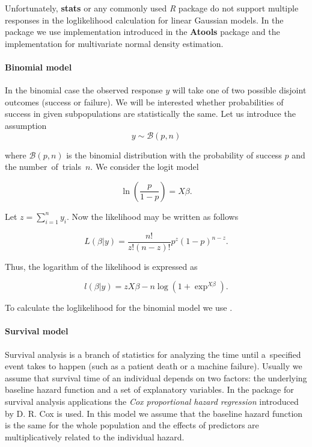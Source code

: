Unfortunately, \textbf{stats} or any commonly used \emph{R} package do not support multiple responses in the loglikelihood calculation for linear Gaussian models. In the package we use  implementation introduced in the \textbf{Atools} package \citep{atools} and the  \citep{mvtnorm} implementation for multivariate normal density estimation.

\break

\paragraph{Binomial model}

In the binomial case the observed response $y$ will take one of two possible disjoint outcomes (success or failure). We will be interested whether probabilities of success in given subpopulations are statistically the same. Let us introduce the assumption
$$y \sim \mathcal{B}\left(p, n\right)$$

where $\mathcal{B}\left(p,n\right)$ is the binomial distribution with the probability of success $p$ and the number~of~trials~$n$. We consider the logit model 

$$\ln\left(\frac{p}{1 - p}\right) = X \beta.$$

Let $z = \sum_{i = 1}^n y_i$. Now the likelihood may be written as follows  \citep{binom}

$$L\left(\beta | y \right) = 
\frac{n!}{z!\left(n - z\right)!}p ^z \left(1 - p\right)^{n - z}.$$

Thus, the logarithm of the likelihood is expressed as 

$$l\left(\beta|y\right) = zX\beta - n \log{\left(1 + \exp^{X\beta}\right)}.$$


To calculate the loglikelihood for the binomial model we use .

\paragraph{Survival model}

Survival analysis is a branch of statistics for analyzing the time until a~specified event takes to happen (such as a patient death or a machine failure). Usually we assume that survival time of an individual depends on two factors: the underlying baseline hazard function and a set of explanatory variables. In the package for survival analysis applications the \emph{Cox proportional hazard regression} introduced by D. R. Cox \citep{coxph} is used. In this model we assume that the baseline hazard function is the same for the whole population and the effects of predictors are multiplicatively related to the individual hazard. 

